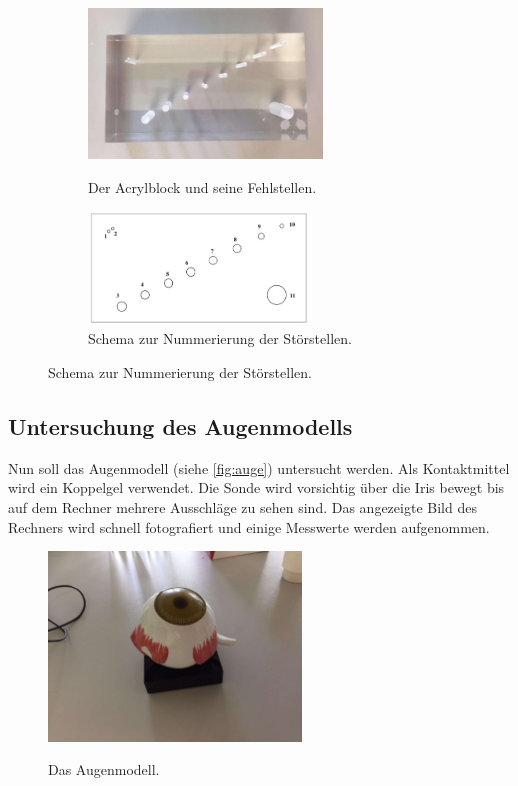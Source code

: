 \begin{figure}
    \begin{subfigure}{0.56\textwidth}
        \centering
        \includegraphics[height=4cm]{content/acrylblock_gedreht.pdf}
        \caption{Der Acrylblock und seine Fehlstellen.}\cite{anleitung}
        \label{fig:acrylblock}
    \end{subfigure}
\hfill
    \begin{subfigure}{0.40\textwidth}
        \centering
        \includegraphics[height=3cm]{content/schema_block.jpg}
        \caption{Schema zur Nummerierung der Störstellen.} %
        \label{fig:schemablock}
    \end{subfigure}
\end{figure}

\subsection{Untersuchung des Augenmodells}
\label{subsec:auge}
Nun soll das Augenmodell (siehe \autoref{fig:auge}) untersucht werden.
Als Kontaktmittel wird ein Koppelgel verwendet.
Die Sonde wird vorsichtig über die Iris bewegt bis auf dem Rechner mehrere Ausschläge zu sehen sind.
Das angezeigte Bild des Rechners wird schnell fotografiert und einige Messwerte werden aufgenommen.

\begin{figure}
    \centering
    \includegraphics[width=0.6\textwidth]{content/auge.pdf}
    \caption{Das Augenmodell.}\cite{anleitung}
    \label{fig:auge}
\end{figure}